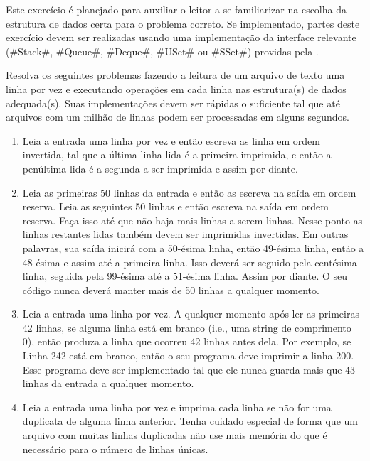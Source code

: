 \begin{exc}
  Este exercício é planejado para auxiliar o leitor a se familiarizar na escolha da estrutura de dados certa para o problema correto. Se implementado, partes deste exercício devem ser realizadas usando uma implementação da interface relevante
  (#Stack#, #Queue#, #Deque#, #USet# ou #SSet#)
  providas pela .

  Resolva os seguintes problemas fazendo a leitura de um arquivo de texto uma linha por vez e executando operações em cada linha nas estrutura(s) de dados adequada(s).
Suas implementações devem ser rápidas o suficiente tal que até arquivos com um milhão de linhas podem ser processadas em alguns segundos.
  \begin{enumerate}
    \item Leia a entrada uma linha por vez e então escreva as linha em ordem invertida, tal que a última linha lida é a primeira imprimida, e então a penúltima lida é a segunda a ser imprimida e assim por diante. 
    \item Leia as primeiras 50 linhas da entrada e então as escreva na saída em ordem reserva. Leia as seguintes 50 linhas e então escreva na saída em ordem reserva. Faça isso até que não haja mais linhas a serem linhas. Nesse ponto as linhas restantes lidas também devem ser imprimidas invertidas.
Em outras palavras, sua saída inicirá com a 50-ésima linha, então 49-ésima linha, então a 48-ésima e assim até a primeira linha. Isso deverá ser seguido pela centésima linha, seguida pela 99-ésima até a 51-ésima linha. Assim por diante.
O seu código nunca deverá manter mais de 50 linhas a qualquer momento.

\item Leia a entrada uma linha por vez.
  A qualquer momento após ler as primeiras 42 linhas, se alguma linha está em branco (i.e., uma string de comprimento 0), então produza a linha que ocorreu 42 linhas antes dela. Por exemplo, se Linha 242 está em branco, então o seu programa deve imprimir a linha 200. Esse programa deve ser implementado tal que ele nunca guarda mais que 43 linhas da entrada a qualquer momento.

\item Leia a entrada uma linha por vez e imprima cada linha se não for uma duplicata de alguma linha anterior. Tenha cuidado especial de forma que um arquivo com muitas linhas duplicadas não use mais memória do que é necessário para o número de linhas únicas.


\end{enumerate}
\end{exc}
